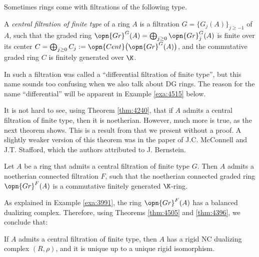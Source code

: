 Sometimes rings come with filtrations of the following type. 

\begin{dfn} \label{dfn:4515}
A {\em central filtration of finite type} of a ring $A$ is a filtration 
$G = \bigl\{ G_j(A) \bigr\}_{j \geq -1}$
of $A$, such that the graded ring 
$\opn{Gr}^G(A) = \bigoplus_{j \geq 0} \opn{Gr}^G_j(A)$
is finite over its center 
$C = \bigoplus_{j \geq 0} C_j  := \opn{Cent} \bigl( \opn{Gr}^G(A) \bigr)$, 
and the commutative graded ring $C$ is finitely generated over $\K$.
\end{dfn}

In \cite{YeZh2.5} such a filtration was called a ``differential 
filtration of finite type'', but this name sounds too confusing when we also 
talk about DG rings. The reason for the name ``differential'' will be apparent 
in Example \ref{exa:4515} below. 

It is not hard to see, using Theorem \ref{thm:4240}, 
that if $A$ admits a central filtration of finite type, then 
it is noetherian. However, much more is true, as the next theorem shows.  
This is a result from \cite{YeZh2.5} that we present without a 
proof. A slightly weaker version of this theorem was in the paper
\cite{McSt} of J.C. McConnell and J.T. Stafford, which 
the authors attributed to J. Bernstein. 

\begin{thm} \label{thm:4505}
Let $A$ be a ring that admits a central filtration of finite type $G$.
Then $A$ admits a noetherian connected filtration $F$, such that the 
noetherian connected graded ring $\opn{Gr}^F(A)$ 
is a commutative finitely generated $\K$-ring.
\end{thm}

As explained in Example \ref{exa:3991}, the 
ring $\opn{Gr}^F(A)$ has a balanced dualizing complex. Therefore, using 
Theorems \ref{thm:4505} and \ref{thm:4396}, we conclude that:

\begin{cor} \label{cor:4515}
If $A$ admits a central filtration of finite type, then $A$ has a 
rigid NC dualizing complex $(R, \rho)$, and it is unique up to 
a unique rigid isomorphism.
\end{cor}

